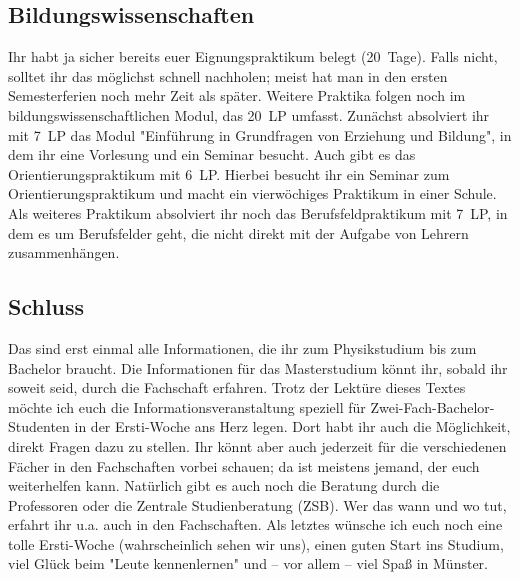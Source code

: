\begin{multicols*}{2}
\subsection*{Bildungswissenschaften}
Ihr habt ja sicher bereits euer Eignungspraktikum belegt (20~Tage). Falls nicht, solltet ihr das möglichst schnell nachholen; meist hat man in den ersten Semesterferien noch mehr Zeit als später. Weitere Praktika folgen noch im bildungswissenschaftlichen Modul, das \SI{20}{LP} umfasst. Zunächst absolviert ihr mit \SI{7}{LP} das Modul "Einführung in Grundfragen von Erziehung und Bildung", in dem ihr eine Vorlesung und ein Seminar besucht. Auch gibt es das Orientierungspraktikum mit \SI{6}{LP}. Hierbei besucht ihr ein Seminar zum Orientierungspraktikum und macht ein vierwöchiges Praktikum in einer Schule. Als weiteres Praktikum absolviert ihr noch das Berufsfeldpraktikum mit \SI{7}{LP}, in dem es um Berufsfelder geht, die nicht direkt mit der Aufgabe von Lehrern zusammenhängen.

\subsection*{Schluss}
Das sind erst einmal alle Informationen, die ihr zum Physikstudium bis zum Bachelor braucht. Die Informationen für das Masterstudium könnt ihr, sobald ihr soweit seid, durch die Fachschaft erfahren. Trotz der Lektüre dieses Textes möchte ich euch die Informationsveranstaltung speziell für Zwei-Fach-Bachelor-Studenten in der Ersti-Woche ans Herz legen. Dort habt ihr auch die Möglichkeit, direkt Fragen dazu zu stellen. Ihr könnt aber auch jederzeit für die verschiedenen Fächer in den Fachschaften vorbei schauen; da ist meistens jemand, der euch weiterhelfen kann. Natürlich gibt es auch noch die Beratung durch die Professoren oder die Zentrale Studienberatung (ZSB). Wer das wann und wo tut, erfahrt ihr u.a. auch in den Fachschaften. Als letztes wünsche ich euch noch eine tolle Ersti-Woche (wahrscheinlich sehen wir uns), einen guten Start ins Studium, viel Glück beim "Leute kennenlernen" und -- vor allem -- viel Spaß in Münster.

\end{multicols*}
